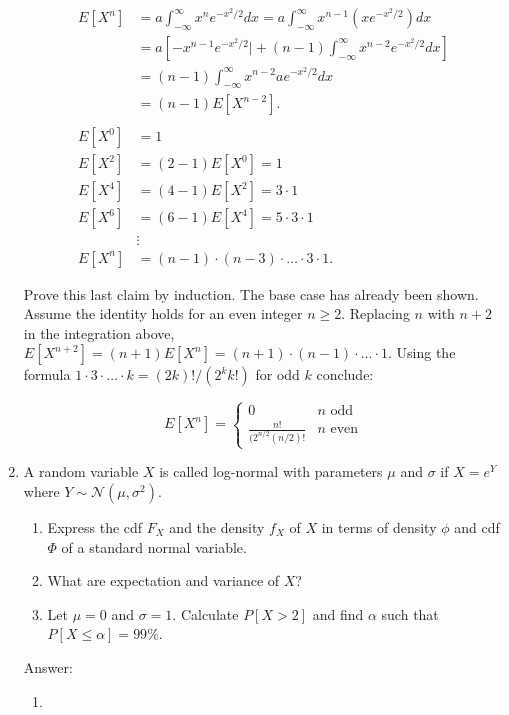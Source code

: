 \documentclass{article}
\begin{document}
\begin{enumerate}
\begin{align*}
E[X^n] &= a\int_{-\infty}^\infty x^ne^{-x^2 /2} dx 
= a\int_{-\infty}^\infty x^{n-1}\left(x e^{-x^2 /2}\right) dx \\
&= a\left[-x^{n-1}e^{-x^2/2} \biggr\vert + (n-1)\int_{-\infty}^\infty x^{n-2}e^{-x^2/2} dx \right] \\
&= (n-1)\int_{-\infty}^\infty x^{n-2}a e^{-x^2/2} dx \\
&= (n-1)E[X^{n-2}]. \\
& \\
E[X^0] &= 1 \\
E[X^2] &= (2-1)E[X^0] = 1 \\
E[X^4] &= (4-1)E[X^2] = 3 \cdot 1 \\
E[X^6] &= (6-1)E[X^4] = 5 \cdot 3 \cdot 1 \\
& \vdots \\
E[X^n] &= (n-1) \cdot (n-3) \cdot  \dots \cdot 3 \cdot 1. 
\end{align*}

Prove this last claim by induction. The base case has already been shown. Assume the identity holds for an even integer $n \geq 2$. Replacing $n$ with $n+2$ in the integration above, $E[X^{n+2}] = (n+1)E[X^n] = (n+1)\cdot (n-1) \cdot \dots \cdot 1$. Using the formula $1 \cdot 3 \cdot \dots \cdot k = (2k)! / (2^k k!)$ for odd $k$ conclude:

$$
E[X^n] = \begin{cases}
0 & n \text{ odd} \\
\frac{n!}{(2^{n/2} (n/2)!} & n \text{ even}
\end{cases}
$$


\newpage
\item
A random variable $X$ is called log-normal with parameters $\mu$ and $\sigma$ if $X = e^Y$ where
$Y \sim \mathcal{N}(\mu,\sigma^2)$.

\begin{enumerate}
\item
Express the cdf $F_X$ and the density $f_X$ of $X$ in terms of density $\phi$ and cdf $\Phi$ of a
standard normal variable.
\item
What are expectation and variance of $X$?
\item
Let $\mu = 0$ and $\sigma = 1$. Calculate $P[X > 2]$ and find $\alpha$ such that $P[X \leq \alpha] = 99\%$.
\end{enumerate}

Answer:

\begin{enumerate}
\item


\end{enumerate}
\end{enumerate}
\end{document}
